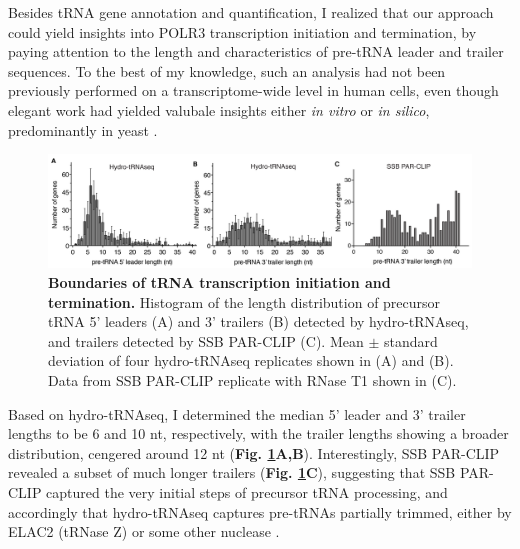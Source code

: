 \documentclass[12pt]{rockefeller}
\begin{document}
Besides tRNA gene annotation and quantification, I realized that our approach could yield insights into POLR3 transcription initiation and termination, by paying attention to the length and characteristics of pre-tRNA leader and trailer sequences. To the best of my knowledge, such an analysis had not been previously performed on a transcriptome-wide level in human cells, even though elegant work had yielded valubale insights either \textit{in vitro} or \textit{in silico}, predominantly in yeast \cite{Maraia:2010kx,Arimbasseri:2013dg,Nielsen:2013be,Arimbasseri:2013by,Arimbasseri:2014hj,Arimbasseri:2015jg}.

\begin{figure}[!ht]%
\centering
\includegraphics[width=\textwidth]{paper6.png}%
\caption[Boundaries of tRNA transcription initiation and termination.]
{\textbf{Boundaries of tRNA transcription initiation and termination.}
Histogram of the length distribution of precursor tRNA 5’ leaders (A) and 3’ trailers (B) detected by hydro-tRNAseq, and trailers detected by SSB PAR-CLIP (C). Mean $\pm$ standard deviation of four hydro-tRNAseq replicates shown in (A) and (B). Data from SSB PAR-CLIP replicate with RNase T1 shown in (C).}
\centering
\label{paper6}%
\end{figure}

Based on hydro-tRNAseq, I determined the median 5’ leader and 3’ trailer lengths to be 6 and 10 nt, respectively, with the trailer lengths showing a broader distribution, cengered around 12 nt (\textbf{Fig. \ref{paper6}A,B}). Interestingly, SSB PAR-CLIP revealed a subset of much longer trailers (\textbf{Fig. \ref{paper6}C}), suggesting that SSB PAR-CLIP captured the very initial steps of precursor tRNA processing, and accordingly that hydro-tRNAseq captures pre-tRNAs partially trimmed, either by ELAC2 (tRNase Z) or some other nuclease \cite{Phizicky:2010jf}.
\end{document}
